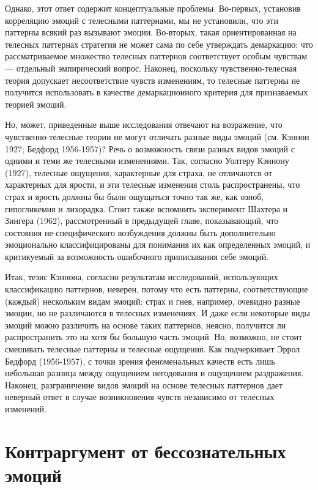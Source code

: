 \documentclass[11pt]{book}
\begin{document}
Однако, этот ответ содержит концептуальные проблемы. Во-первых, установив корреляцию эмоций с телесными паттернами, мы не установили, что эти паттерны всякий раз вызывают эмоции. Во-вторых, такая ориентированная на телесных паттернах стратегия не может сама по себе утверждать демаркацию: что рассматриваемое множество телесных паттернов соответствует особым чувствам --- отдельный эмпирический вопрос. Наконец, поскольку чувственно-телесная теория допускает несоответствие чувств изменениям, то телесные паттерны не получится использовать в качестве демаркационного критерия для признаваемых теорией эмоций.

Но, может, приведенные выше исследования отвечают на возражение, что чувственно-телесные теории не могут отличать разные виды эмоций (см. Кэннон 1927; Бедфорд 1956-1957)? Речь о возможность связи разных видов эмоций с одними и теми же телесными изменениями. Так, согласно Уолтеру Кэннону (1927), телесные ощущения, характерные для страха, не отличаются от характерных для ярости, и эти телесные изменения столь распространены, что страх и ярость должны бы были ощущаться точно так же, как озноб, гипогликемия и лихорадка. Стоит также вспомнить эксперимент Шахтера и Зингера (1962), рассмотренный в предыдущей главе, показывающий, что состояния не-специфического возбуждения должны быть дополнительно эмоционально классифицированы для понимания их как определенных эмоций, и критикуемый за возможность ошибочного приписывания себе эмоций.

Итак, тезис Кэннона, согласно результатам исследований, использующих классификацию паттернов, неверен, потому что есть паттерны, соответствующие (каждый) нескольким видам эмоций: страх и гнев, например, очевидно разные эмоции, но не различаются в телесных изменениях. И даже если некоторые виды эмоций можно различить на основе таких паттернов, неясно, получится ли распространить это на хотя бы большую часть эмоций. Но, возможно, не стоит смешивать телесные паттерны и телесные ощущения. Как подчеркивает Эррол Бедфорд (1956-1957), с точки зрения феноменальных качеств есть лишь небольшая разница между ощущением негодования и ощущением раздражения. Наконец, разграничение видов эмоций на основе телесных паттернов дает неверный ответ в случае возникновения чувств независимо от телесных изменений.

\section{Контраргумент от бессознательных эмоций}
\end{document}
